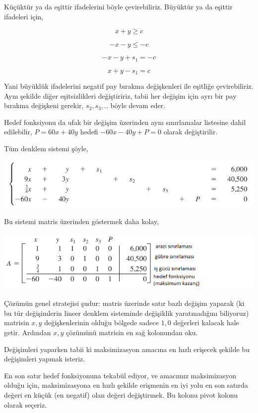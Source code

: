 \documentclass[12pt,fleqn]{article}\usepackage{../../common}
\begin{document}
Küçüktür ya da eşittir ifadelerini böyle çevirebiliriz. Büyüktür ya da eşittir
ifadeleri için,

$$ x + y \ge c $$

$$ -x - y \le -c $$

$$ -x - y + s_1 = -c $$

$$ x + y - s_1 = c $$

Yani büyüklük ifadelerini negatif pay bırakma değişkenleri ile eşitliğe
çevirebiliriz. Aynı şekilde diğer eşitsizlikleri değiştiririz, tabii her değişim
için ayrı bir pay bırakma değişkeni gerekir, $s_2,s_3,..$ böyle devam eder.

Hedef fonksiyonu da ufak bir değişim üzerinden aynı sınırlamalar listesine dahil
edilebilir, $P = 60x + 40y$ hedefi $-60x -40y + P = 0$ olarak değiştirilir.

Tüm denklem sistemi şöyle,

\includegraphics[height=2.5cm]{func_simplex_01.png}

Bu sistemi matris üzerinden göstermek daha kolay,

\includegraphics[height=3cm]{func_simplex_02.png}

Çözümün genel stratejisi şudur: matris üzerinde satır bazlı değişim yaparak (ki
bu tür değişimlerin lineer denklem sisteminde değişiklik yaratmadığını
biliyoruz) matrisin $x,y$ değişkenlerinin olduğu bölgede sadece $1,0$
değerleri kalacak hale getir. Ardından $x,y$ çözümünü matrisin en sağ kolonundan
oku.

Değişimleri yaparken tabii ki maksimizasyon amacına en hızlı erişecek şekilde bu
değişimleri yapmak isteriz.

En son satır hedef fonksiyonuna tekabül ediyor, ve amacımız maksimizasyon olduğu
için, maksimizasyona en hızlı şekilde erişmenin en iyi yolu en son satırda
değeri en küçük (en negatif) olan değeri değiştirmek. Bu kolonu pivot kolonu
olarak seçeriz.
\end{document}
